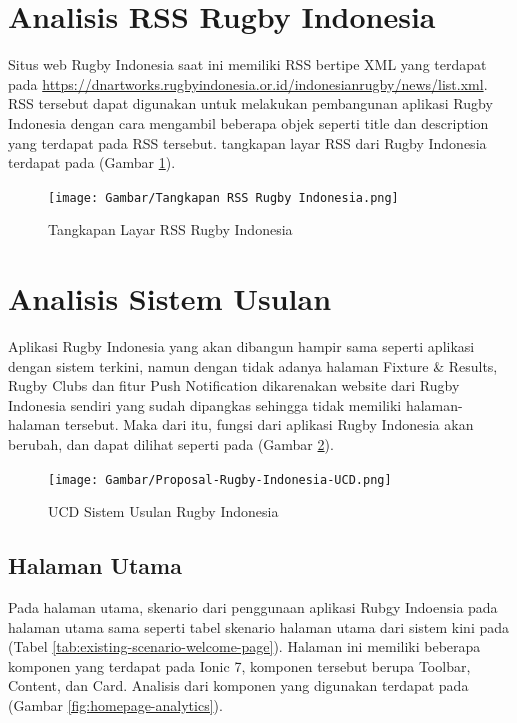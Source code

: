 \section{Analisis RSS Rugby Indonesia}
Situs web Rugby Indonesia saat ini memiliki RSS bertipe XML yang terdapat pada \url{https://dnartworks.rugbyindonesia.or.id/indonesianrugby/news/list.xml}. RSS tersebut dapat digunakan untuk melakukan pembangunan aplikasi Rugby Indonesia dengan cara mengambil beberapa objek seperti title dan description yang terdapat pada RSS tersebut. tangkapan layar RSS dari Rugby Indonesia terdapat pada (Gambar \ref{fig:rss-rugby-indonesia}).

\begin{figure} [H]
    \centering
    \texttt{[image: Gambar/Tangkapan RSS Rugby Indonesia.png]}
    \caption{Tangkapan Layar RSS Rugby Indonesia}
    \label{fig:rss-rugby-indonesia}
\end{figure}

\section{Analisis Sistem Usulan}
Aplikasi Rugby Indonesia yang akan dibangun hampir sama seperti aplikasi dengan sistem terkini, namun dengan tidak adanya halaman Fixture \& Results, Rugby Clubs dan fitur Push Notification dikarenakan website dari Rugby Indonesia sendiri yang sudah dipangkas sehingga tidak memiliki halaman-halaman tersebut. Maka dari itu, fungsi dari aplikasi Rugby Indonesia akan berubah, dan dapat dilihat seperti pada (Gambar \ref{fig:proposal-ucd-rugby-indonesia}).

\begin{figure} [H]
    \centering
    \texttt{[image: Gambar/Proposal-Rugby-Indonesia-UCD.png]}
    \caption{UCD Sistem Usulan Rugby Indonesia}
    \label{fig:proposal-ucd-rugby-indonesia}
\end{figure}

\subsection{Halaman Utama}
Pada halaman utama, skenario dari penggunaan aplikasi Rubgy Indoensia pada halaman utama sama seperti tabel skenario halaman utama dari sistem kini pada (Tabel \ref{tab:existing-scenario-welcome-page}). Halaman ini memiliki beberapa komponen yang terdapat pada Ionic 7, komponen tersebut berupa Toolbar, Content, dan Card. Analisis dari komponen yang digunakan terdapat pada (Gambar \ref{fig:homepage-analytics}).

